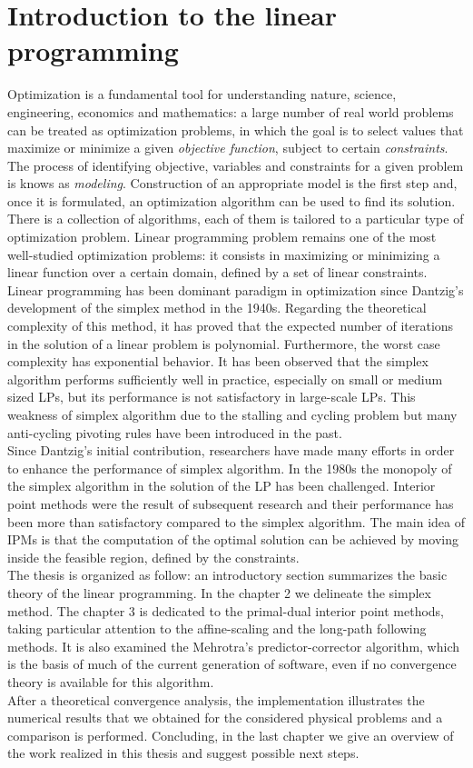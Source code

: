 \documentclass[a4paper,10 pt,titlepage,twoside]{book}
\theoremstyle{plain}
\theoremstyle{definition}
\theoremstyle{remark}
\begin{document}
\chapter{Introduction to the linear programming}
Optimization is a fundamental tool for understanding nature, science, engineering, economics and mathematics: a large number of real world problems can be treated as optimization problems, in which the goal is to select values that maximize or minimize a given \textit{objective function}, subject to certain \textit{constraints}.\\ The process of identifying objective, variables and constraints for a given problem is knows as \textit{modeling}. Construction of an appropriate model is the first step and, once it is formulated, an optimization algorithm can be used to find its solution. There is a collection of algorithms, each of them is tailored to a particular type of optimization problem. Linear programming problem remains one of the most well-studied optimization problems: it consists in maximizing or minimizing a linear function over a certain domain, defined by a set of linear constraints.\\
Linear programming has been dominant paradigm in optimization since Dantzig's development of the simplex method in the 1940s. Regarding the theoretical complexity of this method, it has proved that the expected number of iterations in the solution of a linear problem is polynomial. Furthermore, the worst case complexity has exponential behavior. It has been observed that the simplex algorithm performs sufficiently well in practice, especially on small or medium sized LPs, but its performance is not satisfactory in large-scale LPs. This weakness of simplex algorithm due to the stalling and cycling problem but many anti-cycling pivoting rules have been introduced in the past.\\
Since Dantzig's initial contribution, researchers have made many efforts in order to enhance the performance of simplex algorithm. In the 1980s the monopoly of the simplex algorithm in the solution of the LP has been challenged. Interior point methods were the result of subsequent research and their performance has been more than satisfactory compared to the simplex algorithm. The main idea of IPMs is that the computation of the optimal solution can be achieved by moving inside the feasible region, defined by the constraints. \\
The thesis is organized as follow:
an introductory section summarizes the basic theory of the linear programming. In the chapter 2 we delineate the simplex method. The chapter 3 is dedicated to the primal-dual interior point methods, taking particular attention to the affine-scaling and the long-path following methods. It is also examined the Mehrotra's predictor-corrector algorithm, which is the basis of much of the current generation of software, even if no convergence theory is available for this algorithm.\\After a theoretical convergence analysis, the implementation illustrates the numerical results that we obtained for the considered physical problems and a comparison is performed.
Concluding, in the last chapter we give an overview of the work realized in this thesis and suggest possible next steps. 
\end{document}

